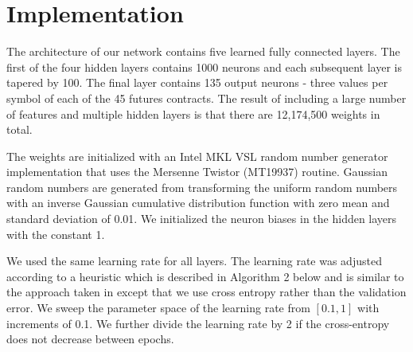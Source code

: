 \documentclass{article}
\begin{document}
\section{Implementation} \label{sect:implementation}

The architecture of our network contains five learned fully connected layers. The first of the four hidden layers contains 1000 neurons and each subsequent layer is tapered by 100. The final layer contains 135 output neurons - three values per symbol of each of the 45 futures contracts.  The result of including a large number of features and multiple hidden layers is that there are 12,174,500 weights in total.

The weights are initialized with an Intel MKL VSL random number generator implementation that uses the Mersenne Twistor (MT19937) routine. Gaussian random numbers are generated from transforming the uniform random numbers with an inverse Gaussian cumulative distribution function with zero mean and standard deviation of 0.01. We initialized the neuron biases in the hidden layers with the constant 1. 

We used the same learning rate for all layers. The learning rate was adjusted according to a heuristic which is described in Algorithm 2 below and is similar to the approach taken in \citet{krizhevsky2012} except that we use cross entropy rather than the validation error. We sweep the parameter space of the learning rate from $[0.1,1]$ with increments of 0.1. We further divide the learning rate by 2 if the cross-entropy does not decrease between epochs.
\end{document}
